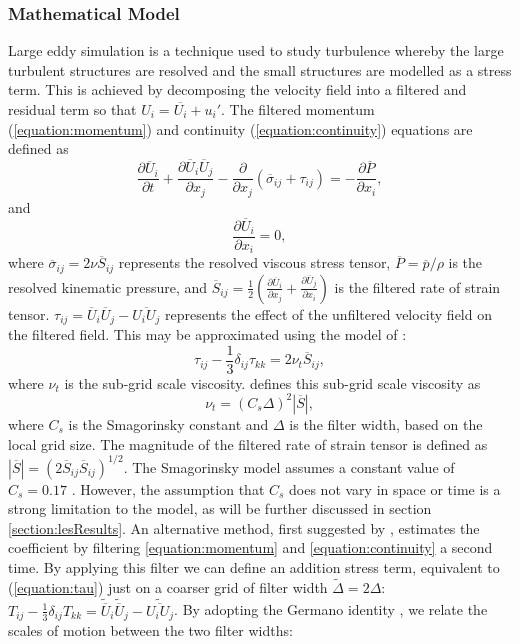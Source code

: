\documentclass[12pt,oneside,a4paper]{article}
\newcommand{\pdev}[2]{\frac{\partial {#1}}{\partial {#2}}}
\newcommand{\vecti}[1]{{#1}_{i}}
\newcommand{\vectj}[1]{{#1}_{j}}
\newcommand{\matij}[1]{{#1}_{ij}}
\begin{document}
\subsubsection{Mathematical Model}
\label{section:mathematicalModel}
Large eddy simulation is a technique used to study turbulence whereby the large turbulent structures are resolved and the small structures are modelled as a stress term. This is achieved by decomposing the velocity field into a filtered and residual term so that $\vecti{U} = \overline{\vecti{U}} + \vecti{u}'$. The filtered momentum (\ref{equation:momentum}) and continuity (\ref{equation:continuity}) equations \citep{pope2001} are defined as
\begin{equation}
\label{equation:momentum}
\pdev{\vecti{\overline{U}}}{t} + \pdev{\vecti{\overline{U}} \vectj{\overline{U}}}{\vectj{x}} - \pdev{}{\vectj{x}}(\matij{\overline{\sigma}} + \matij{\tau}) = - \pdev{\overline{P}}{\vecti{x}},
\end{equation}
and
\begin{equation}
\label{equation:continuity}
\pdev{\vecti{\overline{U}}}{\vecti{x}} = 0,
\end{equation}
where $\matij{\overline{\sigma}} = 2\nu \matij{\overline{S}}$ represents the resolved viscous stress tensor, $\overline{P} = \overline{p}/\rho$ is the resolved kinematic pressure, and $\matij{\overline{S}} = \frac{1}{2}\left( \pdev{\vecti{\overline{U}}}{\vectj{x}} + \pdev{\vectj{\overline{U}}}{\vecti{x}} \right)$ is the filtered rate of strain tensor. $\tau_{ij} = \vecti{\overline{U}} \vectj{\overline{U}} - \overline{\vecti{U} \vectj{U}}$ represents the effect of the unfiltered velocity field on the filtered field. This may be approximated using the model of \cite{smagorinsky1963}:
\begin{equation}
\label{equation:tau}
\matij{\tau}-\frac{1}{3}\matij{\delta}\tau_{kk} = 2\nu_{t} \matij{\overline{S}},
\end{equation}
where $\nu_t$ is the sub-grid scale viscosity. \cite{smagorinsky1963} defines this sub-grid scale viscosity as
\begin{equation}
\label{equation:smagorinsky}
\nu_t = (C_s \Delta)^2 |\overline{S}|,
\end{equation}
where $C_s$ is the Smagorinsky constant and $\Delta$ is the filter width, based on the local grid size. The magnitude of the filtered rate of strain tensor is defined as $|\overline{S}|= (2 \matij{\overline{S}} \matij{\overline{S}})^{1/2}$. The Smagorinsky model assumes a constant value of $C_s = 0.17$ \citep{smagorinsky1963}. However, the assumption that $C_s$ does not vary in space or time is a strong limitation to the model, as will be further discussed in section \ref{section:lesResults}. An alternative method, first suggested by \cite{germano1991}, estimates the coefficient by filtering \eqref{equation:momentum} and \eqref{equation:continuity} a second time. By applying this filter we can define an addition stress term, equivalent to (\ref{equation:tau}) just on a coarser grid of filter width $\widetilde{\Delta} = 2\Delta$: $\matij{T}-\frac{1}{3}\matij{\delta}T_{kk} =\vecti{\widetilde{\overline{U}}}\vectj{\widetilde{\overline{U}}}-\widetilde{\overline{\vecti{U}\vectj{U}}}$. By adopting the Germano identity \citep{germano1991}, we relate the scales of motion between the two filter widths:
\end{document}
